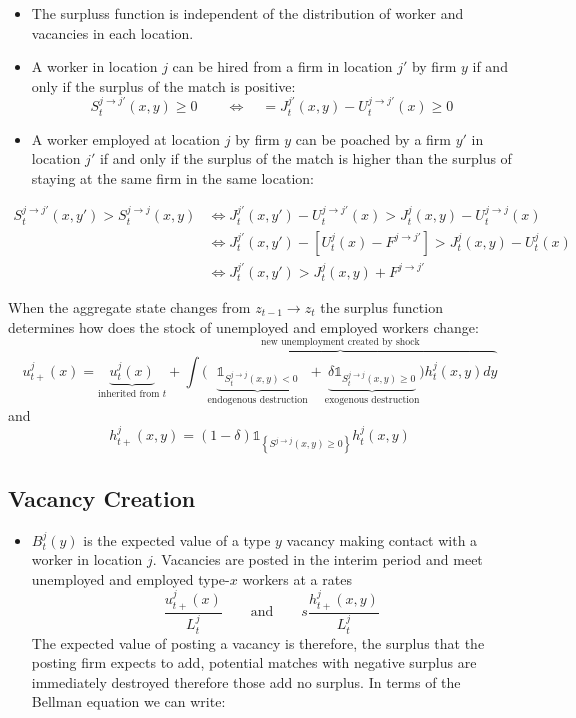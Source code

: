 \documentclass[
  letterpaper,
  DIV=11,
  numbers=noendperiod]{scrreprt}
\providecommand{\tightlist}{%
  \setlength{\itemsep}{0pt}\setlength{\parskip}{0pt}}\usepackage{longtable,booktabs,array}
\begin{document}
\begin{itemize}
\tightlist
\item
  The surpluss function is independent of the distribution of worker and
  vacancies in each location.
\item
  A worker in location \(j\) can be hired from a firm in location \(j'\)
  by firm \(y\) if and only if the surplus of the match is positive:
  \[S^{j\to j'}_{t}(x,y) \geq 0 \qquad \iff \quad = J^{j'}_{t}(x,y) - U^{j\to j'}_t(x) \geq 0\]
\item
  A worker employed at location \(j\) by firm \(y\) can be poached by a
  firm \(y'\) in location \(j'\) if and only if the surplus of the match
  is higher than the surplus of staying at the same firm in the same
  location:
\end{itemize}

\begin{align*}
S^{j\to j'}_{t}(x,y') > S^{j\to j}_{t}(x,y) &\iff J^{j'}_{t}(x,y') - U^{j\to j'}_t(x) > J^{j}_{t}(x,y) - U^{j\to j}_t(x) \\
&\iff J^{j'}_{t}(x,y') - [U^{j}_t(x) - F^{j\to j'}] > J^{j}_{t}(x,y) - U^{j}_t(x) \\
&\iff J^{j'}_{t}(x,y') > J^{j}_{t}(x,y) +  F^{j\to j'}
\end{align*}

When the aggregate state changes from \(z_{t-1} \to z_t\) the surplus
function determines how does the stock of unemployed and employed
workers change:
\[u^{j}_{t+}(x) = \underbrace{u^j_t(x)}_{\text{inherited from }t} + \overbrace{\int \Big(\underbrace{\mathbb{1}_{S^{j \to j}_t(x,y)<0}}_{\text{endogenous destruction}} + \underbrace{\delta\mathbb{1}_{S^{j \to j}_t(x,y)\geq0}}_{\text{exogenous destruction}}\Big)h^j_t(x,y)dy}^{\text{new unemployment created by shock}}\]
and
\[h^{j}_{t+}(x,y) = (1-\delta)\mathbb{1}_{\left\{S^{j \to j}(x,y)\geq 0\right\}}h^j_t(x,y)\]

\hypertarget{vacancy-creation}{%
\subsection{Vacancy Creation}\label{vacancy-creation}}

\begin{itemize}
\tightlist
\item
  \(B^j_t(y)\) is the expected value of a type \(y\) vacancy making
  contact with a worker in location \(j\). Vacancies are posted in the
  interim period and meet unemployed and employed type-\(x\) workers at
  a rates
  \[\frac{u^j_{t+}(x)}{L^j_t} \qquad \text{and} \qquad s\frac{h^j_{t+}(x,y)}{L^j_t}\]
  The expected value of posting a vacancy is therefore, the surplus that
  the posting firm expects to add, potential matches with negative
  surplus are immediately destroyed therefore those add no surplus. In
  terms of the Bellman equation we can write:
\end{itemize}
\end{document}

